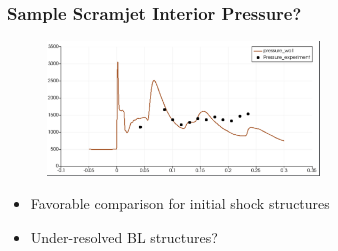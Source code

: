 \documentclass{beamer}
\begin{document}
%
%



\begin{frame}\frametitle{Sample Scramjet Interior Pressure?}

   \vspace{10pt}
	\begin{figure}
		\centering
	  \includegraphics[height=1.4in]{Figures/scramjetPressure.pdf}
	\end{figure}

	 \begin{itemize}
	  \item Favorable comparison for initial shock structures
	  \item Under-resolved BL structures?
	 \end{itemize}
	 
\end{frame}
	 

       
	 
\end{document}
